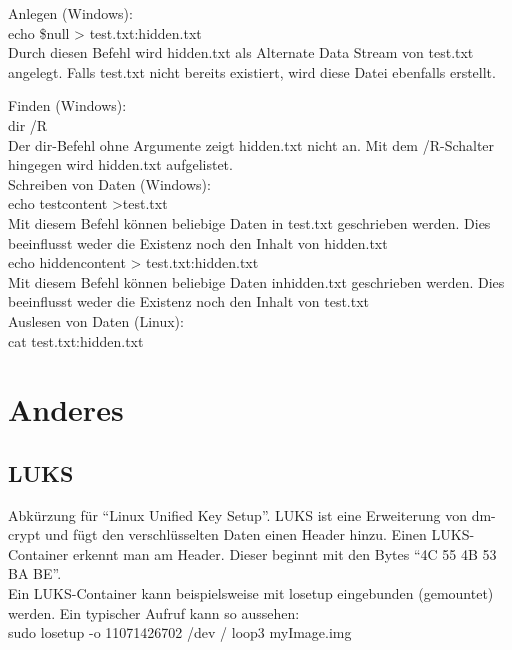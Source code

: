 \begin{multicols}{3}
Anlegen (Windows):\\

echo \$null > test.txt:hidden.txt\\
Durch diesen Befehl wird hidden.txt als Alternate Data Stream von test.txt angelegt. Falls test.txt nicht bereits existiert, wird diese Datei ebenfalls erstellt.

Finden (Windows):\\

dir /R\\
Der dir-Befehl ohne Argumente zeigt hidden.txt nicht an. Mit dem /R-Schalter hingegen wird hidden.txt aufgelistet.\\

Schreiben von Daten (Windows):\\

echo testcontent >test.txt\\
Mit diesem Befehl können beliebige Daten in test.txt geschrieben werden. Dies beeinflusst weder die Existenz noch den Inhalt von hidden.txt\\

echo hiddencontent > test.txt:hidden.txt\\
Mit diesem Befehl können beliebige Daten inhidden.txt geschrieben werden. Dies beeinflusst weder die Existenz noch den Inhalt von test.txt\\

Auslesen von Daten (Linux):\\
cat test.txt:hidden.txt\\


\section{Anderes}
\subsection{LUKS}
Abkürzung für \enquote{Linux Unified Key Setup}. LUKS ist eine Erweiterung von dm-crypt und fügt den verschlüsselten Daten einen Header hinzu. Einen LUKS-Container erkennt man am Header. Dieser beginnt mit den Bytes \enquote{4C 55 4B 53 BA BE}.\\
Ein LUKS-Container kann beispielsweise mit losetup eingebunden (gemountet) werden. Ein typischer Aufruf kann so aussehen:\\
sudo losetup -o 11071426702 /dev / loop3 myImage.img\\
\end{multicols}